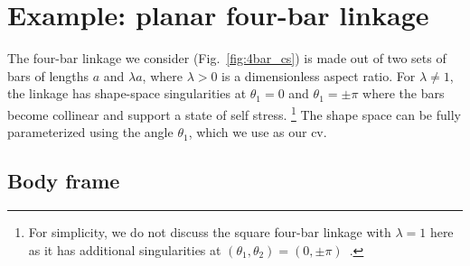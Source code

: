 

\section{Example: planar four-bar linkage}
\label{sec:4bar}

The four-bar linkage we consider (Fig.~\ref{fig:4bar_cs}) is made out of two sets of bars of lengths $a$ and $\lambda a$, where $\lambda > 0$ is a dimensionless aspect ratio.
For $\lambda \ne 1$, the linkage has shape-space singularities at $\theta_{1} = 0$ and $\theta_{1} = \pm \pi$ where the bars become collinear and support a state of self stress.%
\footnote{For simplicity, we do not discuss the square four-bar linkage with $\lambda=1$ here as it has additional singularities at $(\theta_{1}, \theta_{2}) = (0, \pm\pi)$~\cite{yang1994}.}
The shape space can be fully parameterized using the angle $\theta_{1}$, which we use as our \ac{cv}.

\subsection{Body frame}

